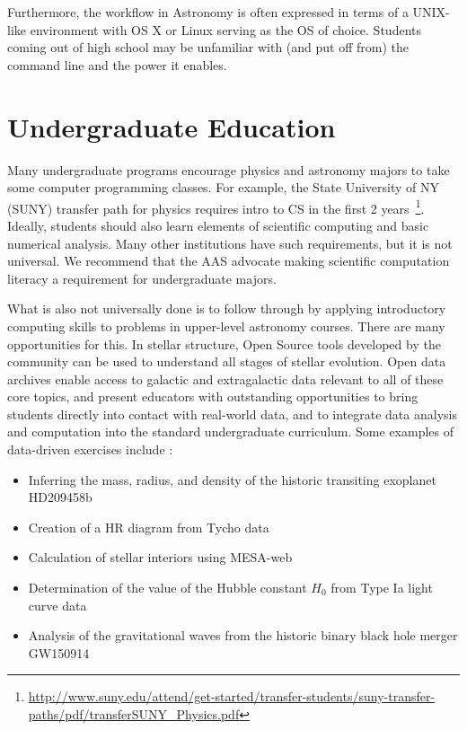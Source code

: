 \documentclass[11pt]{article}
\newenvironment{squishlist}                                                     
  {\begin{itemize}                                                              
    \addtolength{\itemsep}{-0.33\baselineskip}                                  
   }                                                                            
  { \end{itemize} }
\begin{document}
Furthermore, the workflow in Astronomy is often expressed in terms of
a UNIX-like environment with OS X or Linux serving as the OS of
choice.  Students coming out of high school may be unfamiliar with
(and put off from) the command line and the power it enables.

\section{Undergraduate Education}

Many undergraduate programs encourage physics and astronomy majors to
take some computer programming classes.  For example, the State
University of NY (SUNY) transfer path for physics requires intro to CS
in the first 2
years~\footnote{\url{http://www.suny.edu/attend/get-started/transfer-students/suny-transfer-paths/pdf/transferSUNY_Physics.pdf}}.
Ideally, students should also learn elements of scientific computing and
basic numerical analysis.  Many other institutions have such
requirements, but it is not universal.  We recommend that the AAS
advocate making scientific computation literacy a requirement for
undergraduate majors.

What is also not universally done is to follow through by
applying introductory computing skills to problems in upper-level astronomy
courses.  There are many opportunities for this.  In stellar
structure, Open Source tools developed by the community can be used to
understand all stages of stellar evolution. Open data archives enable
access to galactic and extragalactic data relevant to all of these
core topics, and present educators with outstanding opportunities to
bring students directly into contact with real-world data, and to
integrate data analysis and computation into the standard
undergraduate curriculum. Some examples of data-driven exercises
include :
\begin {squishlist}

\item Inferring the mass, radius, and density of the historic transiting exoplanet HD209458b

\item Creation of a HR diagram from Tycho data

\item Calculation of stellar interiors using MESA-web

\item Determination of the value of the Hubble constant $H_0$ from Type Ia light curve data

\item Analysis of the gravitational waves from the historic binary black hole merger GW150914

\end {squishlist}
\end{document}
